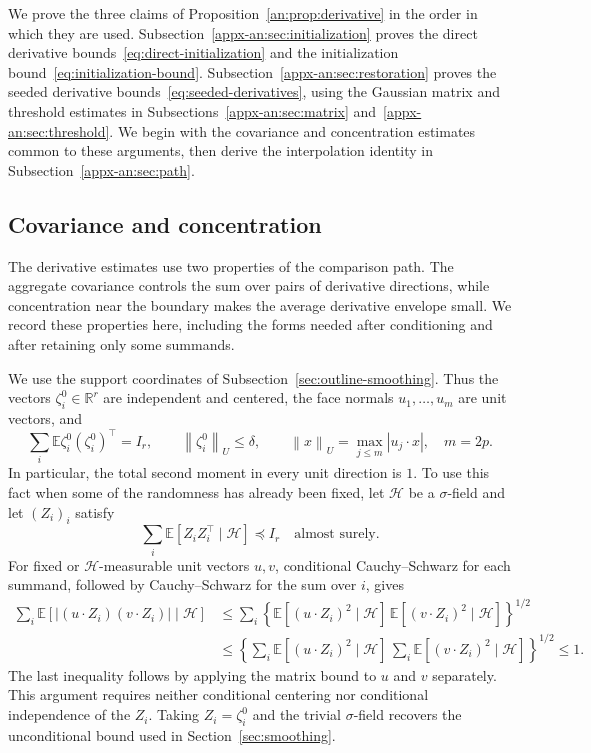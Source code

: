 \documentclass[11pt,letterpaper]{article}
\theoremstyle{remark}
\newcommand{\E}{\mathbb E}
\newcommand{\R}{\mathbb R}
\newcommand{\norm}[1]{\left\lVert#1\right\rVert}
\begin{document}
We prove the three claims of Proposition~\ref{an:prop:derivative}
in the order in which they are used.
Subsection~\ref{appx-an:sec:initialization} proves the direct
derivative bounds~\eqref{eq:direct-initialization} and the
initialization bound~\eqref{eq:initialization-bound}.
Subsection~\ref{appx-an:sec:restoration} proves the seeded
derivative bounds~\eqref{eq:seeded-derivatives}, using the Gaussian
matrix and threshold estimates in
Subsections~\ref{appx-an:sec:matrix} and~\ref{appx-an:sec:threshold}.
We begin with the covariance and concentration estimates common
to these arguments, then derive the interpolation identity in
Subsection~\ref{appx-an:sec:path}.

\subsection{Covariance and concentration}
\label{appx-an:sec:coords}

The derivative estimates use two properties of the comparison path.
The aggregate covariance controls the sum over pairs of derivative
directions, while concentration near the boundary makes the average
derivative envelope small. We record these properties here, including
the forms needed after conditioning and after retaining only some
summands.

We use the support coordinates of
Subsection~\ref{sec:outline-smoothing}. Thus the vectors
\(\zeta_i^0\in\R^r\) are independent and centered, the face normals
\(u_1,\ldots,u_m\) are unit vectors, and
\begin{equation}
 \sum_i\E\zeta_i^0(\zeta_i^0)^\top=I_r,
 \qquad \norm{\zeta_i^0}_U\le\delta,
 \qquad \norm x_U=\max_{j\le m}|u_j\cdot x|,
 \quad m=2p.
 \label{appx-eq:projected-bound}
\end{equation}
In particular, the total second moment in every unit direction is
$1$. To use this fact when some of the randomness has already been
fixed, let \(\mathcal H\) be a \(\sigma\)-field and let \((Z_i)_i\)
satisfy
\[
 \sum_i\E[Z_iZ_i^\top\mid\mathcal H]\preceq I_r
 \quad\text{almost surely}.
\]
For fixed or \(\mathcal H\)-measurable unit vectors \(u,v\),
conditional Cauchy--Schwarz for each summand, followed by
Cauchy--Schwarz for the sum over \(i\), gives
\begin{equation}
 \begin{aligned}
 \sum_i\E[|(u\cdot Z_i)(v\cdot Z_i)|\mid\mathcal H]
 &\le\sum_i
   \left\{\E[(u\cdot Z_i)^2\mid\mathcal H]\,
          \E[(v\cdot Z_i)^2\mid\mathcal H]\right\}^{1/2}\\
 &\le\left\{\sum_i\E[(u\cdot Z_i)^2\mid\mathcal H]\,
             \sum_i\E[(v\cdot Z_i)^2\mid\mathcal H]\right\}^{1/2}
 \le1.
 \end{aligned}
 \label{appx-an:pair-contraction}
\end{equation}
The last inequality follows by applying the matrix bound to \(u\)
and \(v\) separately. This argument requires neither conditional
centering nor conditional independence of the \(Z_i\).
Taking \(Z_i=\zeta_i^0\) and the trivial \(\sigma\)-field recovers
the unconditional bound used in Section~\ref{sec:smoothing}.
\end{document}
